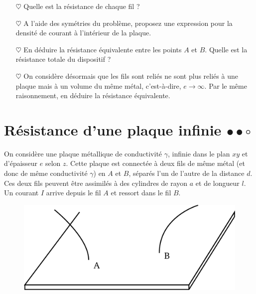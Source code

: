 \documentclass{report}
\begin{document}
\begin{itemize}

	\item[$\heartsuit$] Quelle est la résistance de chaque fil ? 
	
	\item[$\heartsuit$] A l'aide des symétries du problème, proposez une expression pour la densité de courant à l'intérieur de la plaque. 
	
	\item[$\heartsuit$] En déduire la résistance équivalente entre les points $A$ et $B$. Quelle est la résistance totale du dispositif ?
	
	\item[$\heartsuit$] On considère désormais que les fils sont reliés ne sont plus reliés à une plaque mais à un volume du même métal, c'est-à-dire, $e\longrightarrow\infty$. Par le même raisonnement, en déduire la résistance équivalente. 

\end{itemize}

\newpage

\section*{Résistance d'une plaque infinie $\bullet\bullet\circ$}

On considère une plaque métallique de conductivité $\gamma$, infinie dans le plan $xy$ et d'épaisseur $e$ selon $z$. Cette plaque est connectée à deux fils de même métal (et donc de même conductivité $\gamma$) en $A$ et $B$, séparés l'un de l'autre de la distance $d$. Ces deux fils peuvent être assimilés à des cylindres de rayon $a$ et de longueur $l$. Un courant $I$ arrive depuis le fil $A$ et ressort dans le fil $B$.

\begin{figure}[h!]
\centering
		\includegraphics[scale=0.3]{plaque.pdf}
\end{figure}
\end{document}
